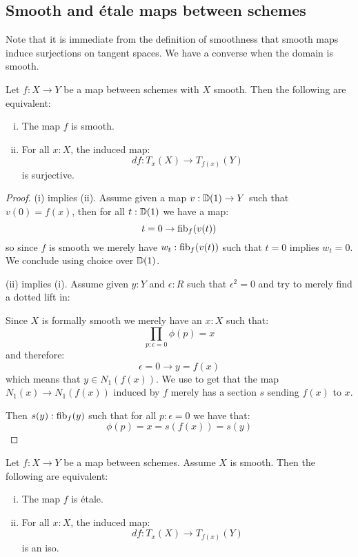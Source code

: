 \subsection{Smooth and étale maps between schemes}

Note that it is immediate from the definition of smoothness that smooth maps induce surjections on tangent spaces. We have a converse when the domain is smooth.

\begin{corollary}\label{smooth-schemes-iff-submersion}
Let $f:X\to Y$ be a map between schemes with $X$ smooth. Then the following are equivalent:
\begin{enumerate}[(i)] 
\item The map $f$ is smooth.
\item For all $x:X$, the induced map:
\[df : T_x(X)\to T_{f(x)}(Y)\]
is surjective.
\end{enumerate}
\end{corollary}

\begin{proof}
(i) implies (ii). Assume given a map $v:\mathbb{D}(1)\to Y$ such that $v(0)=f(x)$, then for all $t:\mathbb{D}(1)$ we have a map:
\[t=0 \to \mathrm{fib}_f(v(t))\]
so since $f$ is smooth we merely have $w_t:\mathrm{fib}_f(v(t))$ such that $t=0$ implies $w_t=0$. We conclude using choice over $\mathbb{D}(1)$.

(ii) implies (i). Assume given $y:Y$ and $\epsilon:R$ such that $\epsilon^2=0$ and try to merely find a dotted lift in:
 \begin{center}
    \end{center}
    Since $X$ is formally smooth we merely have an $x:X$ such that:
\[\prod_{p:\epsilon=0} \phi(p)=x\]
and therefore:
\[ \epsilon=0 \to y=f(x)\]
which means that $y\in N_1(f(x))$. We use  to get that the map $N_1(x)\to N_1(f(x))$ induced by $f$ merely has a section $s$ sending $f(x)$ to $x$.

Then $s(y):\mathrm{fib}_f(y)$ such that for all $p:\epsilon=0$ we have that:
\[\phi(p) = x = s(f(x)) = s(y)\]
\end{proof}

\begin{corollary}\label{etale-schemes-iff-local-iso}
Let $f:X\to Y$ be a map between schemes. Assume $X$ is smooth. Then the following are equivalent:
\begin{enumerate}[(i)]
\item The map $f$ is étale. 
\item For all $x:X$, the induced map:
\[df : T_x(X)\to T_{f(x)}(Y)\]
is an iso.
\end{enumerate}
\end{corollary}

